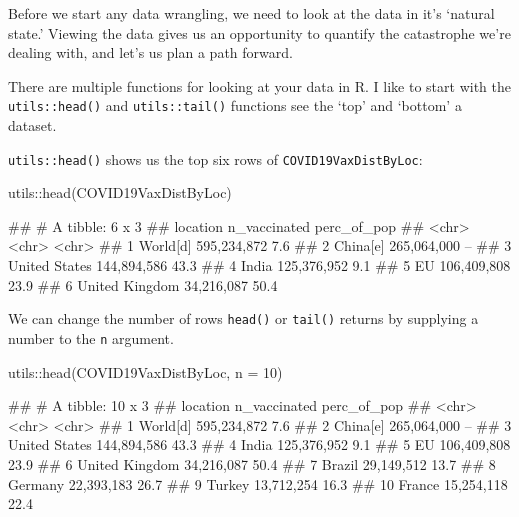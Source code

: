 \documentclass[11pt,]{article}
\newenvironment{Shaded}{\begin{snugshade}}{\end{snugshade}}
\newcommand{\AttributeTok}[1]{\textcolor[rgb]{0.77,0.63,0.00}{#1}}
\newcommand{\DecValTok}[1]{\textcolor[rgb]{0.00,0.00,0.81}{#1}}
\newcommand{\FunctionTok}[1]{\textcolor[rgb]{0.00,0.00,0.00}{#1}}
\newcommand{\NormalTok}[1]{#1}
\newcommand{\SpecialCharTok}[1]{\textcolor[rgb]{0.00,0.00,0.00}{#1}}
\let\oldShaded\Shaded
\let\endoldShaded\endShaded
\renewenvironment{Shaded}{\footnotesize\oldShaded}{\endoldShaded}
\let\oldverbatim\verbatim
\let\endoldverbatim\endverbatim
\renewenvironment{verbatim}{\footnotesize\oldverbatim}{\endoldverbatim}
\begin{document}
Before we start any data wrangling, we need to look at the data in it's
`natural state.' Viewing the data gives us an opportunity to quantify
the catastrophe we're dealing with, and let's us plan a path forward.

There are multiple functions for looking at your data in R. I like to
start with the \texttt{utils::head()} and \texttt{utils::tail()}
functions see the `top' and `bottom' a dataset.

\texttt{utils::head()} shows us the top six rows of
\texttt{COVID19VaxDistByLoc}:

\begin{Shaded}
\begin{Highlighting}[]
\NormalTok{utils}\SpecialCharTok{::}\FunctionTok{head}\NormalTok{(COVID19VaxDistByLoc)}
\end{Highlighting}
\end{Shaded}

\begin{verbatim}
## # A tibble: 6 x 3
##   location       n_vaccinated perc_of_pop
##   <chr>          <chr>        <chr>      
## 1 World[d]       595,234,872  7.6%       
## 2 China[e]       265,064,000  --         
## 3 United States  144,894,586  43.3%      
## 4 India          125,376,952  9.1%       
## 5 EU             106,409,808  23.9%      
## 6 United Kingdom 34,216,087   50.4%
\end{verbatim}

We can change the number of rows \texttt{head()} or \texttt{tail()}
returns by supplying a number to the \texttt{n} argument.

\begin{Shaded}
\begin{Highlighting}[]
\NormalTok{utils}\SpecialCharTok{::}\FunctionTok{head}\NormalTok{(COVID19VaxDistByLoc, }\AttributeTok{n =} \DecValTok{10}\NormalTok{)}
\end{Highlighting}
\end{Shaded}

\begin{verbatim}
## # A tibble: 10 x 3
##    location       n_vaccinated perc_of_pop
##    <chr>          <chr>        <chr>      
##  1 World[d]       595,234,872  7.6%       
##  2 China[e]       265,064,000  --         
##  3 United States  144,894,586  43.3%      
##  4 India          125,376,952  9.1%       
##  5 EU             106,409,808  23.9%      
##  6 United Kingdom 34,216,087   50.4%      
##  7 Brazil         29,149,512   13.7%      
##  8 Germany        22,393,183   26.7%      
##  9 Turkey         13,712,254   16.3%      
## 10 France         15,254,118   22.4%
\end{verbatim}
\end{document}
